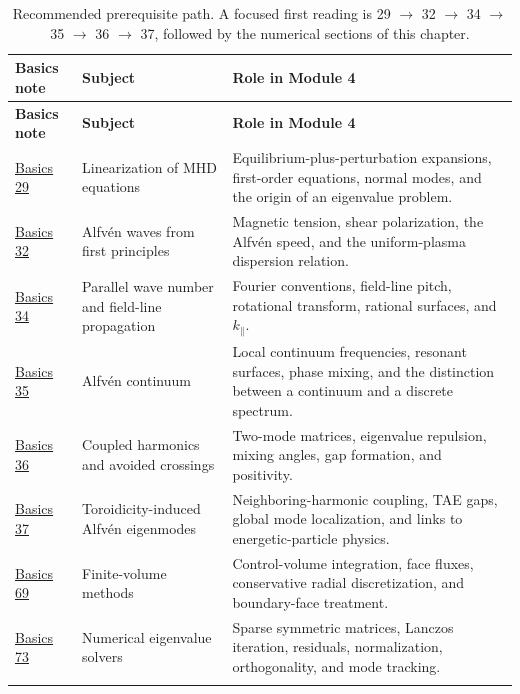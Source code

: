 \documentclass[11pt]{article}
\begin{document}
\begin{longtable}{>{\RaggedRight\arraybackslash}p{} >{\RaggedRight\arraybackslash}p{} >{\RaggedRight\arraybackslash}p{}}
\toprule
\textbf{Basics note} & \textbf{Subject} & \textbf{Role in Module 4}\\
\midrule
\endfirsthead
\toprule
\textbf{Basics note} & \textbf{Subject} & \textbf{Role in Module 4}\\
\midrule
\endhead
\href{run:basics/basics_29_linearization_of_mhd_equations.pdf}{Basics 29} & Linearization of MHD equations & Equilibrium-plus-perturbation expansions, first-order equations, normal modes, and the origin of an eigenvalue problem.\\
\href{run:basics/basics_32_alfven_waves_from_first_principles.pdf}{Basics 32} & Alfv\'en waves from first principles & Magnetic tension, shear polarization, the Alfv\'en speed, and the uniform-plasma dispersion relation.\\
\href{run:basics/basics_34_parallel_wave_number_and_field_line_propagation.pdf}{Basics 34} & Parallel wave number and field-line propagation & Fourier conventions, field-line pitch, rotational transform, rational surfaces, and $k_\parallel$.\\
\href{run:basics/basics_35_alfven_continuum.pdf}{Basics 35} & Alfv\'en continuum & Local continuum frequencies, resonant surfaces, phase mixing, and the distinction between a continuum and a discrete spectrum.\\
\href{run:basics/basics_36_coupled_harmonics_and_avoided_crossings.pdf}{Basics 36} & Coupled harmonics and avoided crossings & Two-mode matrices, eigenvalue repulsion, mixing angles, gap formation, and positivity.\\
\href{run:basics/basics_37_toroidal_alfven_eigenmodes.pdf}{Basics 37} & Toroidicity-induced Alfv\'en eigenmodes & Neighboring-harmonic coupling, TAE gaps, global mode localization, and links to energetic-particle physics.\\
\href{run:basics/basics_69_finite_volume_methods.pdf}{Basics 69} & Finite-volume methods & Control-volume integration, face fluxes, conservative radial discretization, and boundary-face treatment.\\
\href{run:basics/basics_73_numerical_eigenvalue_solvers.pdf}{Basics 73} & Numerical eigenvalue solvers & Sparse symmetric matrices, Lanczos iteration, residuals, normalization, orthogonality, and mode tracking.\\
\bottomrule
\caption{Recommended prerequisite path. A focused first reading is 29 $\rightarrow$ 32 $\rightarrow$ 34 $\rightarrow$ 35 $\rightarrow$ 36 $\rightarrow$ 37, followed by the numerical sections of this chapter.}
\label{tab:module4_prerequisites}
\end{longtable}
\end{document}
